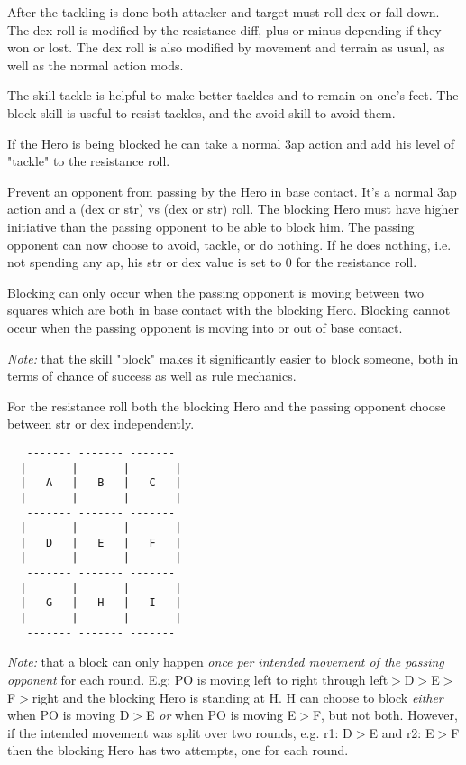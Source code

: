 After the tackling is done both attacker and target must roll dex or fall down. The dex roll is modified by the resistance diff, plus or minus depending if they won or lost. The dex roll is also modified by movement and terrain as usual, as well as the normal action mods.

The skill tackle is helpful to make better tackles and to remain on one's feet. The block skill is useful to resist tackles, and the avoid skill to avoid them.

If the Hero is being blocked he can take a normal 3ap action and add his level of "tackle" to the resistance roll.


 Prevent an opponent from passing by the Hero in base contact. It's a normal 3ap action and a (dex or str) vs (dex or str) roll. The blocking Hero must have higher initiative than the passing opponent to be able to block him. The passing opponent can now choose to avoid, tackle, or do nothing. If he does nothing, i.e. not spending any ap, his str or dex value is set to 0 for the resistance roll.

Blocking can only occur when the passing opponent is moving between two squares which are both in base contact with the blocking Hero. Blocking cannot occur when the passing opponent is moving into or out of base contact.

\emph{Note:} that the skill "block" makes it significantly easier to block someone, both in terms of chance of success as well as rule mechanics.

For the resistance roll both the blocking Hero and the passing opponent choose between str or dex independently.

\begin{samepage} \goodbreak
\scriptsize \begin{verbatim}
   ------- ------- -------
  |       |       |       |
  |   A   |   B   |   C   |
  |       |       |       |
   ------- ------- -------
  |       |       |       |
  |   D   |   E   |   F   |
  |       |       |       |
   ------- ------- -------
  |       |       |       |
  |   G   |   H   |   I   |
  |       |       |       |
   ------- ------- -------
\end{verbatim} \normalsize
\end{samepage}

\emph{Note:} that a block can only happen \emph{once per intended movement of the passing opponent} for each round. E.g: PO is moving left to right through left$>$D$>$E$>$F$>$right and the blocking Hero is standing at H. H can choose to block \emph{either} when PO is moving D$>$E \emph{or} when PO is moving E$>$F, but not both. However, if the intended movement was split over two rounds, e.g. r1: D$>$E and r2: E$>$F then the blocking Hero has two attempts, one for each round.

